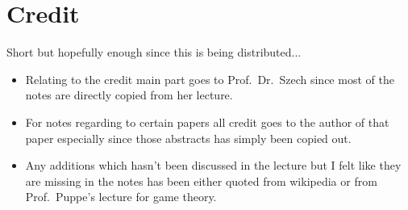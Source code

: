 

\chapter*{Credit}

Short but hopefully enough since this is being distributed...

\begin{itemize}
	\item Relating to the credit main part goes to Prof.~Dr.~Szech since most of the notes are directly copied from her lecture. 
	\item For notes regarding to certain papers all credit goes to the author of that paper especially since those abstracts has simply been copied out.
	\item Any additions which hasn't been discussed in the lecture but I felt like they are missing in the notes has been either quoted from wikipedia or from Prof.~Puppe's lecture for game theory.
\end{itemize}
